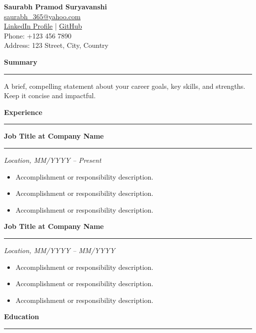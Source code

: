 \documentclass[a4paper,10pt]{article}
\renewcommand{\section}[1]{\vspace{0.1in} \noindent \textbf{\LARGE \textcolor{myblue}{#1}} \vspace{0.05in} \hrule \vspace{0.05in}}
\renewcommand{\subsection}[1]{\vspace{0.1in} \noindent \textbf{\large \textcolor{myblue}{#1}} \vspace{0.05in} \hrule \vspace{0.05in}}
\begin{document}
\pagestyle{empty} %

\begin{center}
    \textbf{\Huge Saurabh Pramod Suryavanshi} \\
    \href{mailto:}{saurabh\_365@yahoo.com} \\
    \href{https://www.linkedin.com/in/yourprofile}{LinkedIn Profile} | \href{https://github.com/yourusername}{GitHub} \\
    Phone: +123 456 7890 \\
    Address: 123 Street, City, Country
\end{center}

\section{Summary}
A brief, compelling statement about your career goals, key skills, and strengths. Keep it concise and impactful.

\section{Experience}
\subsection{Job Title at Company Name}
\textit{Location, MM/YYYY -- Present}
\begin{itemize}[left=0pt]
    \item Accomplishment or responsibility description.
    \item Accomplishment or responsibility description.
    \item Accomplishment or responsibility description.
\end{itemize}

\subsection{Job Title at Company Name}
\textit{Location, MM/YYYY -- MM/YYYY}
\begin{itemize}[left=0pt]
    \item Accomplishment or responsibility description.
    \item Accomplishment or responsibility description.
    \item Accomplishment or responsibility description.
\end{itemize}

\section{Education}
\end{document}
